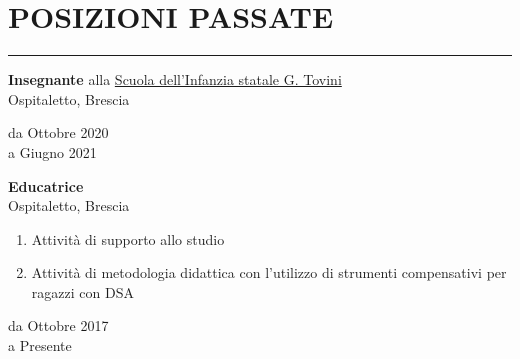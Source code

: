 \documentclass[10pt]{article}
\newcommand{\cvsection}[1]{\section*{\centering\normalsize\uppercase{#1}}\vspace{-16pt}\rule{\linewidth}{0.2pt}\vspace{6pt}}
\begin{document}
\cvsection{Posizioni passate}

\noindent
\begin{minipage}[t]{.8\textwidth}
	\raggedright
	\textbf{Insegnante} alla \href{http://www.icospitaletto.gov.it/la-scuola/plessi/}{Scuola dell'Infanzia statale G. Tovini}\\
	Ospitaletto, Brescia
\end{minipage}%
\hfill\vrule\hfill
\begin{minipage}[t]{.16\textwidth}
	\raggedleft
	da Ottobre 2020\\
	a Giugno 2021
\end{minipage}

\vspace{20pt} %

\noindent
\begin{minipage}[t]{.8\textwidth}
	\raggedright
	\textbf{Educatrice}\\
	Ospitaletto, Brescia
	\vspace{6pt}
	\begin{enumerate}
		\item Attività di supporto allo studio
		\item Attività di metodologia didattica con l'utilizzo di strumenti compensativi per ragazzi con DSA
  \end{enumerate}
\end{minipage}%
\hfill\vrule\hfill
\begin{minipage}[t]{.16\textwidth}
	\raggedleft
	da Ottobre 2017\\
	a Presente
\end{minipage}

\clearpage
\pagestyle{fancy}

\end{document}
